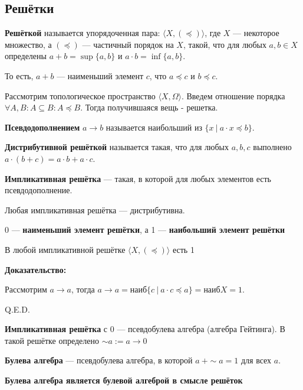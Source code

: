 \subsection{Решётки}

 \textbf{Решёткой} называется упорядоченная пара: $\langle X, (\preceq)\rangle$, 
где $X$ --- некоторое множество, а $(\preceq)$ --- частичный порядок на $X$, такой, 
что для любых $a,b \in X$ определены $a + b = \sup\{a,b\}$ и $a \cdot b = \inf\{a,b\}$.

То есть, $a + b$ --- наименьший элемент $c$, что $a \preceq c$ и $b \preceq c$.


Рассмотрим топологическое пространство $\langle X, \Omega\rangle$. Введем отношение порядка $\forall A,B: A \subseteq B:A \preceq B$. Тогда получившаяся вещь - решетка.

 \textbf{Псевдодополнением} $a \rightarrow b$ называется наибольший из $\{ x \ |\ a \cdot x \preceq b\}$.




 \textbf{Дистрибутивной решёткой} называется такая, что для любых $a,b,c$ выполнено
$a \cdot (b + c) = a \cdot b + a \cdot c$.


 \textbf{Импликативная решётка} --- такая, в которой для любых элементов есть псевдодополнение.


Любая импликативная решётка --- дистрибутивна.


 0 --- \textbf{наименьший элемент решётки}, а 1 --- \textbf{наибольший элемент решётки}


В любой импликативной решётке $\langle X, (\preceq)\rangle$ есть 1

\textbf{Доказательство:}

 Рассмотрим $a \rightarrow a$, тогда $a \rightarrow a = \text{наиб}\{ c \ |\ a \cdot c \preceq a\} = 
\text{наиб} X = 1$.

\hfill Q.E.D.

 \textbf{Импликативная решётка} с 0 --- псевдобулева алгебра (алгебра Гейтинга).
В такой решётке определено $\sim a := a \rightarrow 0$ 

 \textbf{Булева алгебра} --- псевдобулева алгебра, в которой $a\ + \sim a = 1$ для всех $a$.

\textbf{Булева алгебра является булевой алгеброй в смысле решёток}

